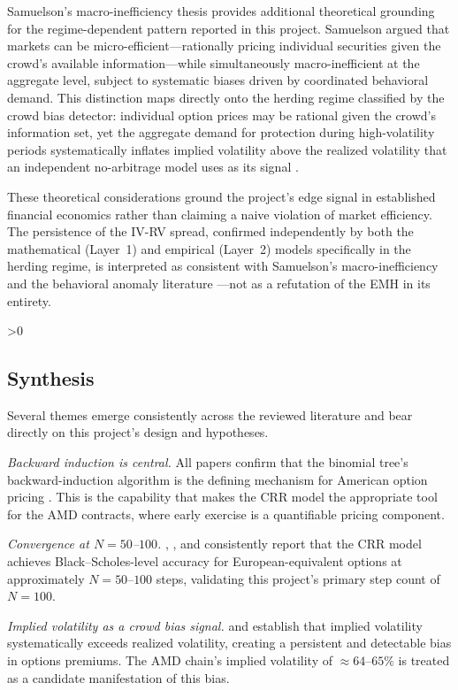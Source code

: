 \documentclass[12pt, letterpaper]{article}
\let\oldsubsection\subsection
\renewcommand{\subsection}{%
  \ifnum\value{subsection}>0 \clearpage\fi
  \oldsubsection
}
\begin{document}
\newpage
Samuelson's macro-inefficiency thesis provides additional theoretical
grounding for the regime-dependent pattern reported in this project.
Samuelson argued that markets can be micro-efficient---rationally
pricing individual securities given the crowd's available
information---while simultaneously macro-inefficient at the aggregate
level, subject to systematic biases driven by coordinated behavioral
demand. This distinction maps directly onto the herding regime
classified by the crowd bias detector: individual option prices may be
rational given the crowd's information set, yet the aggregate demand
for protection during high-volatility periods systematically inflates
implied volatility above the realized volatility that an independent
no-arbitrage model uses as its signal \citep{Fama1970}.

These theoretical considerations ground the project's edge signal in
established financial economics rather than claiming a naive violation
of market efficiency. The persistence of the IV-RV spread, confirmed
independently by both the mathematical (Layer~1) and empirical
(Layer~2) models specifically in the herding regime, is interpreted as
consistent with Samuelson's macro-inefficiency and the behavioral
anomaly literature \citep{Carr2009, Jackwerth1996}---not as a
refutation of the EMH in its entirety.

\subsection{Synthesis}

Several themes emerge consistently across the reviewed literature and
bear directly on this project's design and hypotheses.

\textit{Backward induction is central.} All papers confirm that the
binomial tree's backward-induction algorithm is the defining mechanism
for American option pricing \citep{Cox1979, Mou2022}. This is the
capability that makes the CRR model the appropriate tool for the AMD
contracts, where early exercise is a quantifiable pricing component.

\textit{Convergence at $N = 50$--$100$.} \citet{Nwobi2023},
\citet{Josheski2020}, and \citet{Zhang2023} consistently report that
the CRR model achieves Black--Scholes-level accuracy for
European-equivalent options at approximately $N = 50$--$100$ steps,
validating this project's primary step count of $N = 100$.

\textit{Implied volatility as a crowd bias signal.} \citet{Carr2009}
and \citet{Jackwerth1996} establish that implied volatility
systematically exceeds realized volatility, creating a persistent and
detectable bias in options premiums. The AMD chain's implied volatility
of $\approx 64$--$65\%$ is treated as a candidate manifestation of
this bias.
\end{document}
